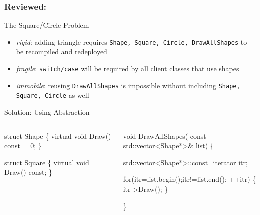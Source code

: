 \documentclass[9pt]{beamer}
\begin{document}
\begin{frame}[fragile]
  \frametitle{Reviewed: \secname}
  \begin{block}{The Square/Circle Problem}
    \begin{itemize}
    \item \emph{rigid}: adding triangle requires \texttt{Shape, Square, Circle, DrawAllShapes} to be recompiled and redeployed
    \item \emph{fragile}: \texttt{switch/case} will be required by all client classes that use shapes
    \item \emph{immobile}: reusing \texttt{DrawAllShapes} is impossible without including \texttt{Shape, Square, Circle} as well
    \end{itemize}
  \end{block}
\pause
\begin{block}{Solution: Using Abstraction}
    
    \begin{columns}[t]
      \begin{column}{.45\textwidth}
        \small
        \begin{semiverbatim}
struct Shape \{ 
  virtual void Draw() const = 0; 
\}

struct Square \{ 
  virtual void Draw() const; 
\}
        \end{semiverbatim}
      \end{column}
      \begin{column}{.45\textwidth}
        \scriptsize
        \begin{semiverbatim}
void DrawAllShapes(
  const std::vector<Shape*>& list) \{

  std::vector<Shape*>::const_iterator itr; 

  for(itr=list.begin();itr!=list.end(); ++itr) 
  \{ 
    itr->Draw(); 
  \}

\}
        \end{semiverbatim}
      \end{column}

    \end{columns}

  \end{block}



\end{frame}
\end{document}
